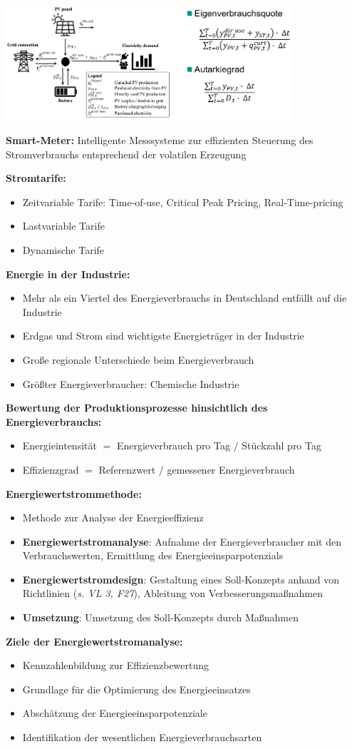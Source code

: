 \begin{center}
	\includegraphics[width=0.8\textwidth]{images/ea.png}
\end{center}

\textbf{Smart-Meter:} Intelligente Messsysteme zur effizienten Steuerung des Stromverbrauchs entsprechend der volatilen Erzeugung

\textbf{Stromtarife:}
\begin{itemize}
	\item Zeitvariable Tarife: Time-of-use, Critical Peak Pricing, Real-Time-pricing
	\item Lastvariable Tarife
	\item Dynamische Tarife
\end{itemize}
\bigskip
\textbf{Energie in der Industrie:}
\begin{itemize}
	\item Mehr als ein Viertel des Energieverbrauchs in Deutschland entfällt auf die Industrie
	\item Erdgas und Strom sind wichtigste Energieträger in der Industrie
	\item Große regionale Unterschiede beim Energieverbrauch
	\item Größter Energieverbraucher: Chemische Industrie
\end{itemize}
\bigskip
\textbf{Bewertung der Produktionsprozesse hinsichtlich des Energieverbrauchs:}
\begin{itemize}
	\item Energieintensität $=$ Energieverbrauch pro Tag $/$ Stückzahl pro Tag
	\item Effizienzgrad $=$ Referenzwert $/$ gemessener Energieverbrauch
\end{itemize}
\bigskip
\textbf{Energiewertstrommethode:}
\begin{itemize}
	\item Methode zur Analyse der Energieeffizienz
	\item \textbf{Energiewertstromanalyse}: Aufnahme der Energieverbraucher mit den Verbrauchswerten, Ermittlung des Energieeinsparpotenzials
	\item \textbf{Energiewertstromdesign}: Gestaltung eines Soll-Konzepts anhand von Richtlinien (\textit{s. VL 3, F27}), Ableitung von Verbesserungsmaßnahmen
	\item \textbf{Umsetzung}: Umsetzung des Soll-Konzepts durch Maßnahmen
\end{itemize}

\textbf{Ziele der Energiewertstromanalyse:}
\begin{itemize}
	\item Kennzahlenbildung zur Effizienzbewertung
	\item Grundlage für die Optimierung des Energieeinsatzes
	\item Abschätzung der Energieeinsparpotenziale
	\item Identifikation der wesentlichen Energieverbrauchsarten
\end{itemize}
